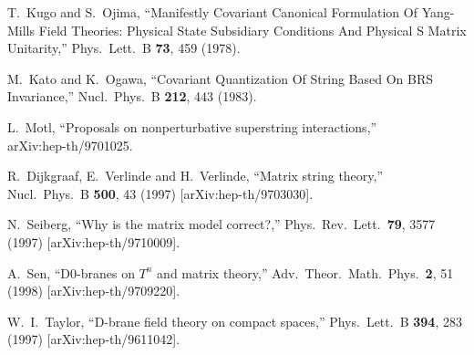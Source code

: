 \documentclass[12pt,a4paper]{article}
\begin{document}
\begin{thebibliography}{99}
 T.~Kugo and S.~Ojima,
	``Manifestly Covariant Canonical Formulation Of Yang-Mills
	Field Theories: Physical State Subsidiary Conditions And
	Physical S Matrix Unitarity,''
	Phys.\ Lett.\ B {\bf 73}, 459 (1978).

 M.~Kato and K.~Ogawa,
	``Covariant Quantization Of String Based On BRS Invariance,''
	Nucl.\ Phys.\ B {\bf 212}, 443 (1983).

L.~Motl,
	``Proposals on nonperturbative superstring interactions,''\\
	arXiv:hep-th/9701025.

R.~Dijkgraaf, E.~Verlinde and H.~Verlinde,
	``Matrix string theory,''
	Nucl.\ Phys.\ B {\bf 500}, 43 (1997)
	[arXiv:hep-th/9703030].

 N.~Seiberg,
	``Why is the matrix model correct?,''
	Phys.\ Rev.\ Lett.\  {\bf 79}, 3577 (1997)
	[arXiv:hep-th/9710009].

 A.~Sen,
	``D0-branes on $T^n$ and matrix theory,''
	Adv.\ Theor.\ Math.\ Phys.\  {\bf 2}, 51 (1998)
	[arXiv:hep-th/9709220].

 W.~I.~Taylor,
	``D-brane field theory on compact spaces,''
	Phys.\ Lett.\ B {\bf 394}, 283 (1997)
	[arXiv:hep-th/9611042].

\end{thebibliography}
\end{document}
